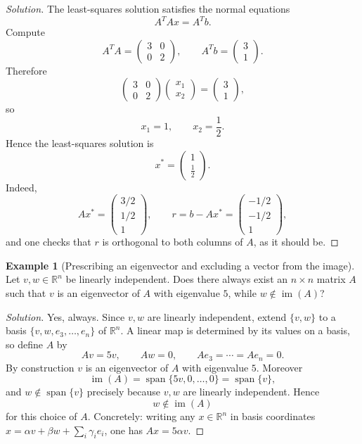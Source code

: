 \documentclass[11pt]{article}
\theoremstyle{definition}
\newtheorem{example}{Example}[section]
\newcommand{\R}{\mathbb{R}}
\newcommand{\Span}{\operatorname{span}}
\begin{document}
\begin{proof}[Solution]
The least-squares solution satisfies the normal equations
\[
A^TAx=A^Tb.
\]
Compute
\[
A^TA=
\begin{pmatrix}
3&0\\
0&2
\end{pmatrix},
\qquad
A^Tb=
\begin{pmatrix}
3\\
1
\end{pmatrix}.
\]
Therefore
\[
\begin{pmatrix}
3&0\\
0&2
\end{pmatrix}
\begin{pmatrix}
x_1\\
x_2
\end{pmatrix}
=
\begin{pmatrix}
3\\
1
\end{pmatrix},
\]
so
\[
x_1=1,
\qquad
x_2=\frac12.
\]
Hence the least-squares solution is
\[
\boxed{x^*=\begin{pmatrix}1\\[2pt] \frac12\end{pmatrix}}.
\]
Indeed,
\[
Ax^*=
\begin{pmatrix}
3/2\\
1/2\\
1
\end{pmatrix},
\qquad
r=b-Ax^*=
\begin{pmatrix}
-1/2\\
-1/2\\
1
\end{pmatrix},
\]
and one checks that $r$ is orthogonal to both columns of $A$, as it should be.
\end{proof}

\begin{example}[Prescribing an eigenvector and excluding a vector from the image]
Let $v,w\in\R^n$ be linearly independent. Does there always exist an $n\times n$ matrix $A$ such that $v$ is an eigenvector of $A$ with eigenvalue $5$, while $w\notin \operatorname{im}(A)$?
\end{example}

\begin{proof}[Solution]
Yes, always. Since $v,w$ are linearly independent, extend $\{v,w\}$ to a basis $\{v,w,e_3,\dots,e_n\}$ of $\R^n$. A linear map is determined by its values on a basis, so define $A$ by
\[
Av=5v, \qquad Aw=0, \qquad Ae_3=\cdots=Ae_n=0.
\]
By construction $v$ is an eigenvector of $A$ with eigenvalue $5$. Moreover
\[
\operatorname{im}(A)=\Span\{5v,0,\dots,0\}=\Span\{v\},
\]
and $w\notin\Span\{v\}$ precisely because $v,w$ are linearly independent. Hence
\[
\boxed{w\notin \operatorname{im}(A)}
\]
for this choice of $A$. Concretely: writing any $x\in\R^n$ in basis coordinates $x=\alpha v+\beta w+\sum_i\gamma_ie_i$, one has $Ax=5\alpha v$.
\end{proof}
\end{document}
